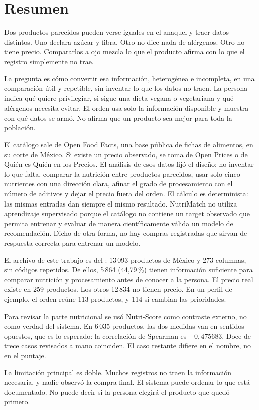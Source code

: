 \section{Resumen}

Dos productos parecidos pueden verse iguales en el anaquel y traer datos distintos. Uno declara azúcar y fibra. Otro no dice nada de alérgenos. Otro no tiene precio. Compararlos a ojo mezcla lo que el producto afirma con lo que el registro simplemente no trae.

La pregunta es cómo convertir esa información, heterogénea e incompleta, en una comparación útil y repetible, sin inventar lo que los datos no traen. La persona indica qué quiere privilegiar, si sigue una dieta vegana o vegetariana y qué alérgenos necesita evitar. El orden usa solo la información disponible y muestra con qué datos se armó. No afirma que un producto sea mejor para toda la población.

El catálogo sale de Open Food Facts, una base pública de fichas de alimentos, en su corte de México. Si existe un precio observado, se toma de Open Prices o de Quién es Quién en los Precios. El análisis de esos datos fijó el diseño: no inventar lo que falta, comparar la nutrición entre productos parecidos, usar solo cinco nutrientes con una dirección clara, afinar el grado de procesamiento con el número de aditivos y dejar el precio fuera del orden. El cálculo es determinista: las mismas entradas dan siempre el mismo resultado. NutriMatch no utiliza aprendizaje supervisado porque el catálogo no contiene un target observado que permita entrenar y evaluar de manera científicamente válida un modelo de recomendación. Dicho de otra forma, no hay compras registradas que sirvan de respuesta correcta para entrenar un modelo.

El archivo de este trabajo es del \corte: 13\,093 productos de México y 273 columnas, sin códigos repetidos. De ellos, 5\,864 (44{,}79\,\%) tienen información suficiente para comparar nutrición y procesamiento antes de conocer a la persona. El precio real existe en 259 productos. Los otros 12\,834 no tienen precio. En un perfil de ejemplo, el orden reúne 113 productos, y 114 si cambian las prioridades.

Para revisar la parte nutricional se usó Nutri-Score como contraste externo, no como verdad del sistema. En 6\,035 productos, las dos medidas van en sentidos opuestos, que es lo esperado: la correlación de Spearman es $-0{,}475683$. Doce de trece casos revisados a mano coinciden. El caso restante difiere en el nombre, no en el puntaje.

La limitación principal es doble. Muchos registros no traen la información necesaria, y nadie observó la compra final. El sistema puede ordenar lo que está documentado. No puede decir si la persona elegirá el producto que quedó primero.
